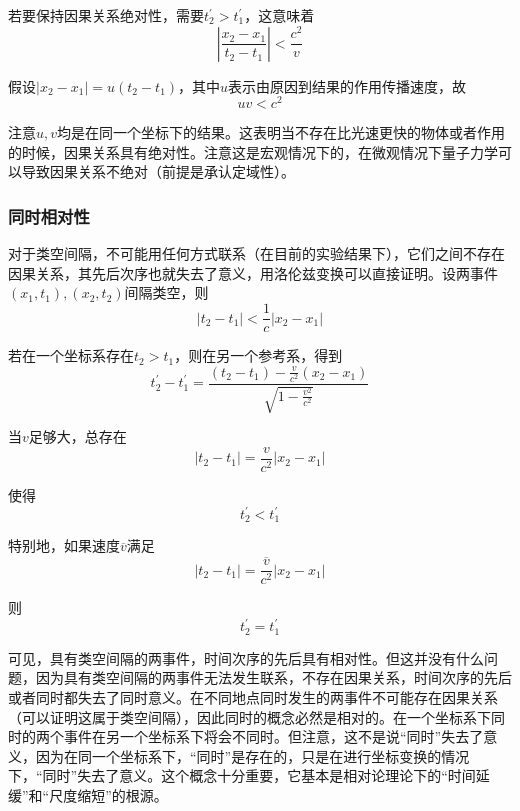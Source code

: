 \documentclass[UTF8]{ctexart}
\begin{document}
\noindent 若要保持因果关系绝对性，需要$t_2^{\prime} > t_1^{\prime}$，这意味着
\begin{equation}
    \left|\frac{x_2-x_1}{t_2-t_1}\right| < \frac{c^2}{v}
\end{equation}

\noindent 假设$|x_2-x_1| = u(t_2-t_1)$，其中$u$表示由原因到结果的作用传播速度，故
\begin{equation}
    uv<c^2
\end{equation}

\noindent 注意$u,v$均是在同一个坐标下的结果。这表明当不存在比光速更快的物体或者作用的时候，因果关系具有绝对性。注意这是宏观情况下的，在微观情况下量子力学可以导致因果关系不绝对（前提是承认定域性）。

    \subsubsection{同时相对性}
    对于类空间隔，不可能用任何方式联系（在目前的实验结果下），它们之间不存在因果关系，其先后次序也就失去了意义，用洛伦兹变换可以直接证明。设两事件$(x_1,t_1),(x_2,t_2)$间隔类空，则
    \begin{equation}
        |t_2-t_1| < \frac{1}{c} |x_2 - x_1|
    \end{equation}

\noindent 若在一个坐标系存在$t_2>t_1$，则在另一个参考系，得到
\begin{equation}
    t_2^{\prime} - t_1^{\prime} = \frac{(t_2-t_1)-\frac{v}{c^2}(x_2-x_1)}{\sqrt{1-\frac{v^2}{c^2}}}
\end{equation}

\noindent 当$v$足够大，总存在
\begin{equation}
    |t_2-t_1| = \frac{v}{c^2} |x_2-x_1|
\end{equation}

\noindent 使得
\begin{equation}
    t_2^{\prime}<t_1^{\prime}
\end{equation}

    特别地，如果速度$\overline{v}$满足
    \begin{equation}
        |t_2-t_1| = \frac{\overline{v}}{c^2} |x_2-x_1|
    \end{equation}

\noindent 则
\begin{equation}
    t_2^{\prime} = t_1^{\prime}
\end{equation}

    可见，具有类空间隔的两事件，时间次序的先后具有相对性。但这并没有什么问题，因为具有类空间隔的两事件无法发生联系，不存在因果关系，时间次序的先后或者同时都失去了同时意义。在不同地点同时发生的两事件不可能存在因果关系（可以证明这属于类空间隔），因此同时的概念必然是相对的。在一个坐标系下同时的两个事件在另一个坐标系下将会不同时。但注意，这不是说“同时”失去了意义，因为在同一个坐标系下，“同时”是存在的，只是在进行坐标变换的情况下，“同时”失去了意义。这个概念十分重要，它基本是相对论理论下的“时间延缓”和“尺度缩短”的根源。
\end{document}
